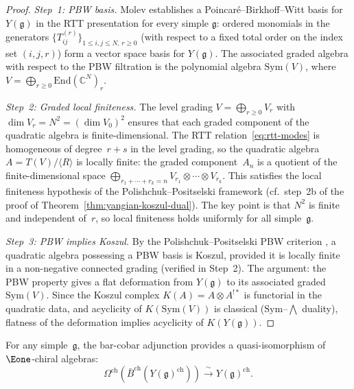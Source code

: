 \begin{proof}
\emph{Step~1: PBW basis.}
Molev \cite{molev-yangians} establishes a Poincar\'{e}--Birkhoff--Witt
basis for $Y(\mathfrak{g})$ in the RTT presentation for every simple
$\mathfrak{g}$: ordered monomials
in the generators $\{T_{ij}^{(r)}\}_{1 \leq i,j \leq N,\, r \geq 0}$
(with respect to a fixed total order on the index set $(i,j,r)$) form
a vector space basis for $Y(\mathfrak{g})$.  The
associated graded algebra with respect to the PBW filtration is the
polynomial algebra $\mathrm{Sym}(V)$, where
$V = \bigoplus_{r \geq 0} \mathrm{End}(\mathbb{C}^N)_r$.

\emph{Step~2: Graded local finiteness.}
The level grading $V = \bigoplus_{r \geq 0} V_r$ with
$\dim V_r = N^2 = (\dim V_0)^2$ ensures that each graded component
of the quadratic algebra is finite-dimensional.  The RTT
relation~\eqref{eq:rtt-modes} is homogeneous of degree~$r+s$ in the
level grading, so the quadratic algebra
$A = T(V)/\langle R \rangle$ is locally finite: the graded
component~$A_n$ is a quotient of the finite-dimensional space
$\bigoplus_{r_1 + \cdots + r_k = n} V_{r_1} \otimes \cdots
\otimes V_{r_k}$.  This satisfies the local finiteness hypothesis
of the Polishchuk--Positselski framework
(cf.\ step~2b of the proof of
Theorem~\ref{thm:yangian-koszul-dual}).  The key point is
that $N^2$ is finite and independent of~$r$, so local finiteness
holds uniformly for all simple~$\mathfrak{g}$.

\emph{Step~3: PBW implies Koszul.}
By the Polishchuk--Positselski PBW criterion \cite[Ch.~4]{PP05}, a
quadratic algebra possessing a PBW basis is Koszul, provided
it is locally finite in a non-negative connected grading (verified
in Step~2).  The argument:
the PBW property gives a flat deformation from $Y(\mathfrak{g})$
to its associated graded $\mathrm{Sym}(V)$.  Since the Koszul complex
$K(A) = A \otimes A^{!\ast}$ is functorial in the quadratic data, and
acyclicity of $K(\mathrm{Sym}(V))$ is classical ($\mathrm{Sym}$--$\bigwedge$ duality),
flatness of the deformation implies acyclicity of $K(Y(\mathfrak{g}))$.
\end{proof}

\begin{corollary}
\label{cor:yangian-bar-cobar}
For any simple~$\mathfrak{g}$, the bar-cobar adjunction provides a
quasi-isomorphism of $\Eone$-chiral algebras:
\[
\Omega^{\mathrm{ch}}(\bar{B}^{\mathrm{ch}}(Y(\mathfrak{g})^{\mathrm{ch}}))
\xrightarrow{\;\sim\;} Y(\mathfrak{g})^{\mathrm{ch}}.
\]
\end{corollary}

